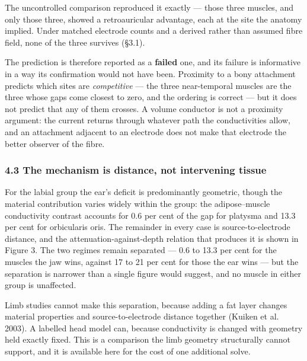 \documentclass[
  11pt,
]{article}
\newcounter{none} %
\begin{document}
The uncontrolled comparison reproduced it exactly --- those three muscles, and only
those three, showed a retroauricular advantage, each at the site the anatomy
implied. Under matched electrode counts and a derived rather than assumed fibre
field, none of the three survives (§3.1).

The prediction is therefore reported as a \textbf{failed} one, and its failure is
informative in a way its confirmation would not have been. Proximity to a bony
attachment predicts which sites are \emph{competitive} --- the three near-temporal
muscles are the three whose gaps come closest to zero, and the ordering is
correct --- but it does not predict that any of them crosses. A volume conductor is
not a proximity argument: the current returns through whatever path the
conductivities allow, and an attachment adjacent to an electrode does not make
that electrode the better observer of the fibre.

\subsubsection{4.3 The mechanism is distance, not intervening tissue}\label{the-mechanism-is-distance-not-intervening-tissue}

For the labial group the ear's deficit is predominantly geometric, though the
material contribution varies widely within the group: the adipose--muscle
conductivity contrast accounts for 0.6 per cent of the gap for platysma and
13.3 per cent for orbicularis oris. The remainder in every case is
source-to-electrode distance, and the attenuation-against-depth relation that
produces it is shown in Figure 3. The two regimes remain separated --- 0.6 to 13.3
per cent for the muscles the jaw wins, against 17 to 21 per cent for those the
ear wins --- but the separation is narrower than a single figure would suggest,
and no muscle in either group is unaffected.

Limb studies cannot make this separation, because adding a fat layer changes
material properties and source-to-electrode distance together (Kuiken et al.
2003). A labelled head model can, because conductivity is changed with
geometry held exactly fixed. This is a comparison the limb geometry
structurally cannot support, and it is available here for the cost of one
additional solve.
\end{document}
